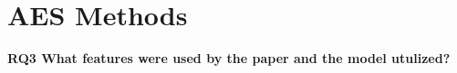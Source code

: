 \documentclass{article}
\begin{document}
	
	\section{AES Methods}
	\textbf{RQ3 What features were used by the paper and the model utulized?}
	
\end{document}
